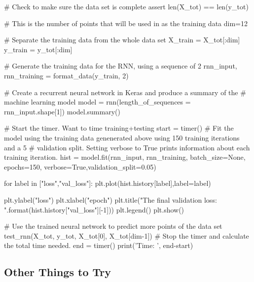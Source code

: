 \documentclass[%
oneside,                 %
final,                   %
10pt]{article}
\begin{document}
# Check to make sure the data set is complete
assert len(X_tot) == len(y_tot)

# This is the number of points that will be used in as the training data
dim=12

# Separate the training data from the whole data set
X_train = X_tot[:dim]
y_train = y_tot[:dim]


# Generate the training data for the RNN, using a sequence of 2
rnn_input, rnn_training = format_data(y_train, 2)


# Create a recurrent neural network in Keras and produce a summary of the 
# machine learning model
model = rnn(length_of_sequences = rnn_input.shape[1])
model.summary()

# Start the timer.  Want to time training+testing
start = timer()
# Fit the model using the training data genenerated above using 150 training iterations and a 5%
# validation split.  Setting verbose to True prints information about each training iteration.
hist = model.fit(rnn_input, rnn_training, batch_size=None, epochs=150, 
                 verbose=True,validation_split=0.05)

for label in ["loss","val_loss"]:
    plt.plot(hist.history[label],label=label)

plt.ylabel("loss")
plt.xlabel("epoch")
plt.title("The final validation loss: {}".format(hist.history["val_loss"][-1]))
plt.legend()
plt.show()

# Use the trained neural network to predict more points of the data set
test_rnn(X_tot, y_tot, X_tot[0], X_tot[dim-1])
# Stop the timer and calculate the total time needed.
end = timer()
print('Time: ', end-start)

\epycod


\subsection{Other Things to Try}
\end{document}
